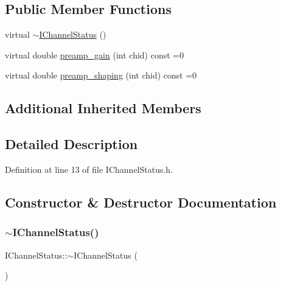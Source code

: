 \subsection*{Public Member Functions}
\begin{DoxyCompactItemize}
\item 
virtual \hyperlink{class_wire_cell_1_1_i_channel_status_a4991418ba6fbaedb6722a473440bf1a9}{$\sim$\+I\+Channel\+Status} ()
\item 
virtual double \hyperlink{class_wire_cell_1_1_i_channel_status_ab9df0f4008fbdc708b7feea486da5c36}{preamp\+\_\+gain} (int chid) const =0
\item 
virtual double \hyperlink{class_wire_cell_1_1_i_channel_status_a330bd0e9627def4736eb1caed6a2fdba}{preamp\+\_\+shaping} (int chid) const =0
\end{DoxyCompactItemize}
\subsection*{Additional Inherited Members}


\subsection{Detailed Description}


Definition at line 13 of file I\+Channel\+Status.\+h.



\subsection{Constructor \& Destructor Documentation}
\mbox{\label{class_wire_cell_1_1_i_channel_status_a4991418ba6fbaedb6722a473440bf1a9}} 
\subsubsection{\texorpdfstring{$\sim$\+I\+Channel\+Status()}{~IChannelStatus()}}
{\footnotesize\ttfamily I\+Channel\+Status\+::$\sim$\+I\+Channel\+Status (\begin{DoxyParamCaption}{ }\end{DoxyParamCaption})\hspace{0.3cm}{\ttfamily [virtual]}}



